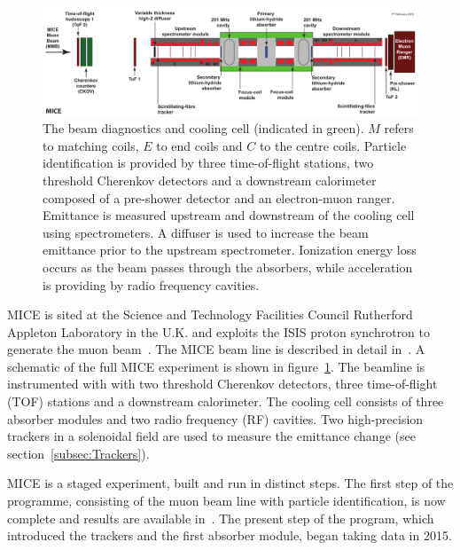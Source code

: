   \begin{figure}[bht]
    \begin{center}
      \includegraphics[width=1.0\linewidth]{01-MICE/Cooling-demo-labels.pdf}
      \caption{\label{fig:CoolingChannel} The beam diagnostics and cooling cell (indicated in green). $M$ refers to matching coils, $E$ to end coils and $C$ to the centre coils. Particle identification is provided by three time-of-flight stations, two threshold Cherenkov detectors and a downstream calorimeter composed of a pre-shower detector and an electron-muon ranger. Emittance is measured upstream and downstream of the cooling cell using spectrometers. A diffuser is used to increase the beam emittance prior to the upstream spectrometer. Ionization energy loss occurs as the beam passes through the absorbers, while acceleration is providing by radio frequency cavities.}
    \end{center}
  \end{figure}

  MICE is sited at the Science and Technology Facilities Council Rutherford Appleton Laboratory in the U.K. and exploits the ISIS proton synchrotron to generate the muon beam~\cite{MiceTarget}.  The MICE beam line is described in detail in~\cite{BeamlineJINST}. A schematic of the full MICE experiment is shown in figure~\ref{fig:CoolingChannel}. The beamline is instrumented with with two threshold Cherenkov detectors, three time-of-flight (TOF) stations and a downstream calorimeter. The cooling cell consists of three absorber modules and two radio frequency (RF) cavities. Two high-precision trackers in a solenoidal field are used to measure the emittance change (see section~\ref{subsec:Trackers}).

  MICE is a staged experiment, built and run in distinct steps. The first step of the programme, consisting of the muon beam line with particle identification, is now complete and results are available in~\cite{BeamlineJINST, BeamCharacterisationEurPhysJ, EMRJINST, PionContaminationJINST}. The present step of the program, which introduced the trackers and the first absorber module, began taking data in 2015. %

